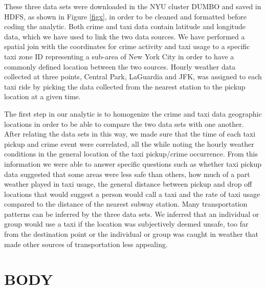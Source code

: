 \documentclass{sigkddExp}
\begin{document}


These three data sets were downloaded in the NYU cluster DUMBO and saved in HDFS, as shown in Figure \ref{figx}, in order to be cleaned and formatted before coding the analytic. Both crime and taxi data contain latitude and longitude data, which we have used to link the two data sources. 
We have performed a spatial join with the coordinates for crime activity and taxi usage to a specific  taxi zone ID representing a sub-area of New York City in order to have a commonly defined location between the two sources.
Hourly weather data collected at three points, Central Park, LaGuardia and JFK, was assigned to each taxi ride by picking the data collected from the nearest station to the pickup location at a given time. 

The first step in our analytic is to homogenize the crime and taxi data geographic locations in order to be able to compare the two data sets with one another. After relating the data sets in this way, we made sure that the time of each taxi pickup and crime event were correlated, all the while noting the hourly weather conditions in the general location of the taxi pickup/crime occurrence. From this information we were able to answer specific questions such as whether taxi pickup data suggested that some areas were less safe than others, how much of a part weather played in taxi usage, the general distance between pickup and drop off locations that would suggest a person would call a taxi and the rate of taxi usage compared to the distance of the nearest subway station. Many transportation patterns can be inferred by the three data sets. We inferred that an individual or group would use a taxi if the location was subjectively deemed unsafe, too far from the destination point or the individual or group was caught in weather that made other sources of transportation less appealing. 


\section{BODY}

\end{document}
